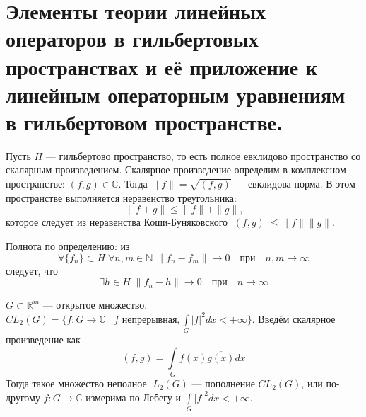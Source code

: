 \documentclass[12pt]{article}
\begin{document}
\section*{Элементы теории линейных операторов в гильбертовых пространствах и её приложение к линейным операторным уравнениям в гильбертовом пространстве.}
Пусть $H$ --- гильбертово пространство, то есть полное евклидово пространство со скалярным произведением.
Скалярное произведение определим в комплексном пространстве: $(f,g) \in \mathbb C$.
Тогда $\|f\| = \sqrt{(f,g)}$ --- евклидова норма.
В этом пространстве выполняется неравенство треугольника:
$$
\|f + g\| \le \|f\| + \|g\|\text{,}
$$
которое следует из неравенства Коши-Буняковского $|(f,g)| \le \|f\|\|g\|$.

Полнота по определению: из
$$
\forall \{f_n\} \subset H\; \forall n,m \in \mathbb N\; \|f_n - f_m\| \to 0 \quad \text{при} \quad n,m \to \infty
$$
следует, что 
$$
\exists h \in H\; \|f_n - h\| \to 0\quad \text{при} \quad n \to \infty
$$

$G \subset \mathbb R^m$ --- открытое множество.
$CL_2(G) = \{f\colon G \to \mathbb C \mid f\text{ непрерывная}, \int\limits_G |f|^2 dx < +\infty\}$.
Введём скалярное произведение как
$$
(f, g) = \int\limits_G f(x) \overline{g(x)} dx
$$
Тогда такое множество неполное.
$L_2(G)$ --- пополнение $CL_2(G)$, или по-другому $f:G \mapsto \mathbb C$ измерима по Лебегу и $\int\limits_G |f|^2 dx < +\infty$.
\end{document}
